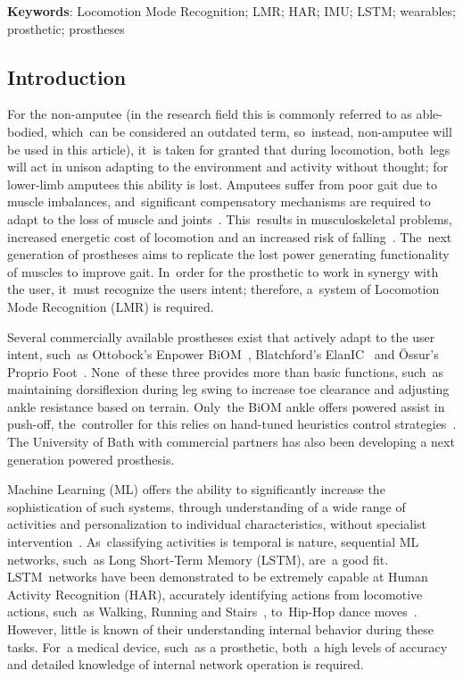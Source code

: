 \textbf{Keywords}: Locomotion Mode Recognition; LMR; HAR; IMU; LSTM; wearables; prosthetic; prostheses
\clearpage

\subsection{Introduction}
For the non-amputee %
(in the research field this is commonly referred to as able-bodied, which~can be considered an outdated term, so~instead, non-amputee will be used in this article), it~is taken for granted that during locomotion, both~legs will act in unison adapting to the environment and activity without thought; for lower-limb amputees this ability is lost. Amputees suffer from poor gait due to muscle imbalances, and~significant compensatory mechanisms are required to adapt to the loss of muscle and joints~\cite{Silverman2008}. This~results in musculoskeletal problems, increased energetic cost of locomotion and an increased risk of falling~\cite{Herr2012, Piazza2017, McDonald2018}. The~next generation of prostheses aims to replicate the lost power generating functionality of muscles to improve gait. In~order for the prosthetic to work in synergy with the user, it~must recognize the users intent; therefore, a~system of Locomotion Mode Recognition (LMR) is required.

Several commercially available prostheses exist that actively adapt to the user intent, such~as Ottobock's Enpower BiOM~\cite{Enpower}, Blatchford's ElanIC~\cite{ElanIC} and \"Ossur's Proprio Foot~\cite{Proprio}. None~of these three provides more than basic functions, such~as maintaining dorsiflexion during leg swing to increase toe clearance and adjusting ankle resistance based on terrain. Only~the BiOM ankle offers powered assist in push-off, the~controller for this relies on hand-tuned heuristics control strategies~\cite{Montgomery2018}. The University of Bath with commercial partners has also been developing a next generation powered prosthesis\cite{Yu2019}.

Machine Learning (ML) offers the ability to significantly increase the sophistication of such systems, through understanding of a wide range of activities and personalization to individual characteristics, without specialist intervention~\cite{Labarriere2020}. As~classifying activities is temporal is nature, sequential ML networks, such~as Long Short-Term Memory (LSTM), are~a good fit. LSTM~networks have been demonstrated to be extremely capable at Human Activity Recognition (HAR), accurately identifying actions from locomotive actions, such~as Walking, Running and Stairs~\cite{Murad2017}, to~Hip-Hop dance moves~\cite{Samprita2020}. However, little is known of their understanding internal behavior during these tasks. For~a medical device, such~as a prosthetic, both~a high levels of accuracy and detailed knowledge of internal network operation is required.

